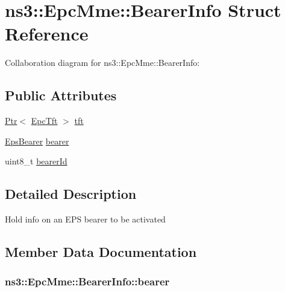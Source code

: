 \hypertarget{structns3_1_1EpcMme_1_1BearerInfo}{}\section{ns3\+:\+:Epc\+Mme\+:\+:Bearer\+Info Struct Reference}
\label{structns3_1_1EpcMme_1_1BearerInfo}


Collaboration diagram for ns3\+:\+:Epc\+Mme\+:\+:Bearer\+Info\+:
\subsection*{Public Attributes}
\begin{DoxyCompactItemize}
\item 
\hyperlink{classns3_1_1Ptr}{Ptr}$<$ \hyperlink{classns3_1_1EpcTft}{Epc\+Tft} $>$ \hyperlink{structns3_1_1EpcMme_1_1BearerInfo_a62c28cf252d968f90d83c0ee5384e900}{tft}
\item 
\hyperlink{structns3_1_1EpsBearer}{Eps\+Bearer} \hyperlink{structns3_1_1EpcMme_1_1BearerInfo_a392a8784ca60b81731f6d39fd3006624}{bearer}
\item 
uint8\+\_\+t \hyperlink{structns3_1_1EpcMme_1_1BearerInfo_a5f585f830140108f1cffe7a4d30fb6ea}{bearer\+Id}
\end{DoxyCompactItemize}


\subsection{Detailed Description}
Hold info on an E\+PS bearer to be activated 

\subsection{Member Data Documentation}
\subsubsection[{\texorpdfstring{bearer}{bearer}}]{ ns3\+::\+Epc\+Mme\+::\+Bearer\+Info\+::bearer}\hypertarget{structns3_1_1EpcMme_1_1BearerInfo_a392a8784ca60b81731f6d39fd3006624}{}\label{structns3_1_1EpcMme_1_1BearerInfo_a392a8784ca60b81731f6d39fd3006624}
